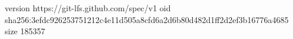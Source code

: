version https://git-lfs.github.com/spec/v1
oid sha256:3efdc926253751212c4e11d505a8cfd6a2d6b80d482d1ff2d2ef3b16776a4685
size 185357
